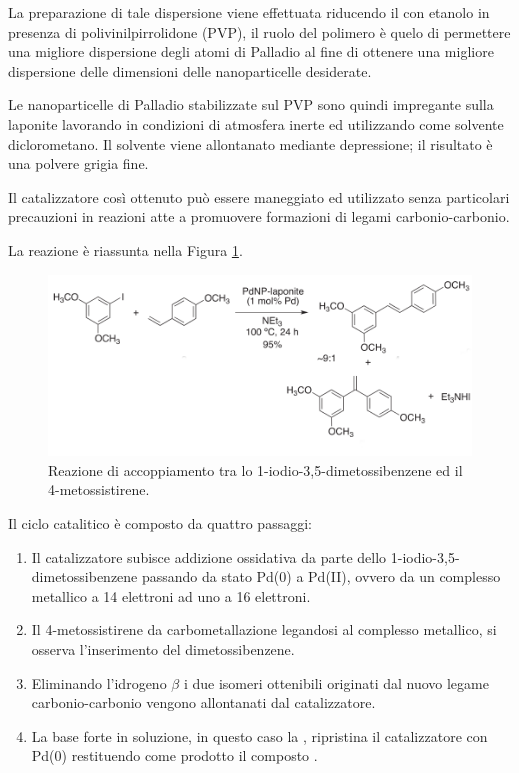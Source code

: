\documentclass[a4paper, 12pt]{article}
\begin{document}
La preparazione di tale dispersione viene effettuata riducendo il  con etanolo in presenza di polivinilpirrolidone (PVP), il ruolo del polimero è quelo di permettere una migliore dispersione degli atomi di Palladio al fine di ottenere una migliore dispersione delle dimensioni delle nanoparticelle desiderate.

Le nanoparticelle di Palladio stabilizzate sul PVP sono quindi impregante sulla laponite lavorando in condizioni di atmosfera inerte ed utilizzando come solvente diclorometano. Il solvente viene allontanato mediante depressione; il risultato è una polvere grigia fine.\cite{martinez_extremely_2015}

Il catalizzatore così ottenuto può essere maneggiato ed utilizzato senza particolari precauzioni in reazioni atte a promuovere formazioni di legami carbonio-carbonio.

La reazione è riassunta nella Figura \ref{fig:h-m_resveratrolo}.

\begin{figure}[H]
	\centering
	\includegraphics[width=\linewidth]{immagini/h-m_resveratrolo.png}
	\caption{Reazione di accoppiamento tra lo 1-iodio-3,5-dimetossibenzene ed il 4-metossistirene.}
	\label{fig:h-m_resveratrolo}
\end{figure}

Il ciclo catalitico è composto da quattro passaggi:
\begin{enumerate}
	\item Il catalizzatore  subisce addizione ossidativa da parte dello 1-iodio-3,5-dimetossibenzene passando da stato Pd(0) a Pd(II), ovvero da un complesso metallico a 14 elettroni ad uno a 16 elettroni.
	\item Il 4-metossistirene da carbometallazione legandosi al complesso metallico, si osserva l'inserimento del dimetossibenzene.
	\item Eliminando l'idrogeno $\beta$ i due isomeri ottenibili originati dal nuovo legame carbonio-carbonio vengono allontanati dal catalizzatore.
	\item La base forte in soluzione, in questo caso la , ripristina il catalizzatore con Pd(0) restituendo come prodotto il composto .
\end{enumerate}
\end{document}
